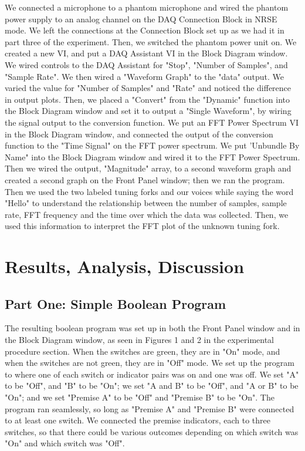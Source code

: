 \documentclass[twoside,10pt]{article}
\begin{document}
\begin{multicols}{2}
		We connected a microphone to a phantom microphone and wired the phantom power supply to an analog channel on the DAQ Connection Block in NRSE mode. We left the connections at the Connection Block set up as we had it in part three of the experiment. Then, we switched the phantom power unit on. We created a new VI, and put a DAQ Assistant VI in the Block Diagram window. We wired controls to the DAQ Assistant for "Stop", "Number of Samples", and "Sample Rate". We then wired a "Waveform Graph" to the "data" output. We varied the value for "Number of Samples" and "Rate" and noticed the difference in output plots. Then, we placed a "Convert" from the "Dynamic" function into the Block Diagram window and set it to output a "Single Waveform", by wiring the signal output to the conversion function. We put an FFT Power Spectrum VI in the Block Diagram window, and connected the output of the conversion function to the "Time Signal" on the FFT power spectrum. We put 'Unbundle By Name" into the Block Diagram window and wired it to the FFT Power Spectrum. Then we wired the output, "Magnitude" array, to a second waveform graph and created a second graph on the Front Panel window; then we ran the program. Then we used the two labeled tuning forks and our voices while saying the word "Hello" to understand the relationship between the number of samples, sample rate, FFT frequency and the time over which the data was collected. Then, we used this information to interpret the FFT plot of the unknown tuning fork. 
		
		
		\section{Results, Analysis, Discussion}
		
		
		\subsection*{Part One: Simple Boolean Program}
		
			The resulting boolean program was set up in both the Front Panel window and in the Block Diagram window, as seen in Figures 1 and 2 in the experimental procedure section. When the switches are green, they are in "On" mode, and when the switches are not green, they are in "Off" mode. We set up the program to where one of each switch or indicator pairs was on and one was off. We set "A" to be "Off", and "B" to be "On"; we set "A and B" to be "Off", and "A or B" to be "On"; and we set "Premise A" to be "Off" and "Premise B" to be "On". The program ran seamlessly, so long as "Premise A" and "Premise B" were connected to at least one switch. We connected the premise indicators, each to three switches, so that there could be various outcomes depending on which switch was "On" and which switch was "Off".


\end{multicols}
\end{document}
